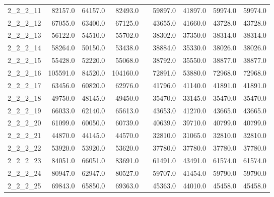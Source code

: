 \begin{longtable}{lrrrcrrrr}
2\_2\_2\_11      &     82157.0 &       64157.0 &        82493.0 &&       59897.0 &         41897.0 &          59974.0 &          59974.0 \\
2\_2\_2\_12      &     67055.0 &       63400.0 &        67125.0 &&       43655.0 &         41660.0 &          43728.0 &          43728.0 \\
2\_2\_2\_13      &     56122.0 &       54510.0 &        55702.0 &&       38302.0 &         37350.0 &          38314.0 &          38314.0 \\
2\_2\_2\_14      &     58264.0 &       50150.0 &        53438.0 &&       38884.0 &         35330.0 &          38026.0 &          38026.0 \\
2\_2\_2\_15      &     55428.0 &       52220.0 &        55068.0 &&       38792.0 &         35550.0 &          38877.0 &          38877.0 \\
2\_2\_2\_16      &    105591.0 &       84520.0 &       104160.0 &&       72891.0 &         53880.0 &          72968.0 &          72968.0 \\
2\_2\_2\_17      &     63456.0 &       60820.0 &        62976.0 &&       41796.0 &         41140.0 &          41891.0 &          41891.0 \\
2\_2\_2\_18      &     49750.0 &       48145.0 &        49450.0 &&       35470.0 &         33145.0 &          35470.0 &          35470.0 \\
2\_2\_2\_19      &     66033.0 &       62140.0 &        65613.0 &&       43653.0 &         41270.0 &          43665.0 &          43665.0 \\
2\_2\_2\_20      &     61099.0 &       60050.0 &        60739.0 &&       40639.0 &         39710.0 &          40799.0 &          40799.0 \\
2\_2\_2\_21      &     44870.0 &       44145.0 &        44570.0 &&       32810.0 &         31065.0 &          32810.0 &          32810.0 \\
2\_2\_2\_22      &     53920.0 &       53920.0 &        53620.0 &&       37780.0 &         37780.0 &          37780.0 &          37780.0 \\
2\_2\_2\_23      &     84051.0 &       66051.0 &        83691.0 &&       61491.0 &         43491.0 &          61574.0 &          61574.0 \\
2\_2\_2\_24      &     80947.0 &       62947.0 &        80527.0 &&       59707.0 &         41454.0 &          59790.0 &          59790.0 \\
2\_2\_2\_25      &     69843.0 &       65850.0 &        69363.0 &&       45363.0 &         44010.0 &          45458.0 &          45458.0 \\

\end{longtable}
